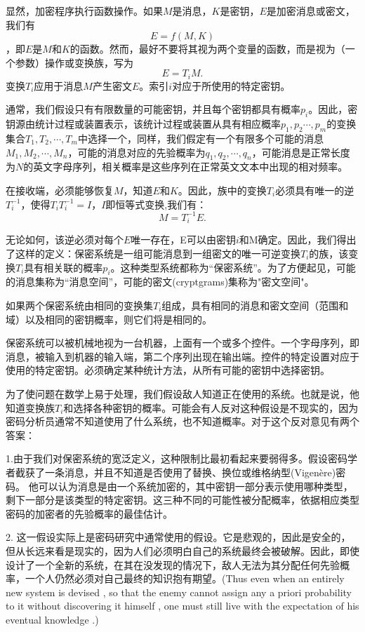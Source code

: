 \documentclass[]{article}
\begin{document}
显然，加密程序执行函数操作。如果$M$是消息，$K$是密钥，$E$是加密消息或密文，我们有\[E=f(M,K)\]，即$E$是$M$和$K$的函数。然而，最好不要将其视为两个变量的函数，而是视为（一个参数）操作或变换族，写为\[E=T_iM.\]
变换$T_i$应用于消息$M$产生密文$E$。索引$i$对应于所使用的特定密钥。

通常，我们假设只有有限数量的可能密钥，并且每个密钥都具有概率$p_i$。因此，密钥源由统计过程或装置表示，该统计过程或装置从具有相应概率$p_1,p_2\cdots,p_m$的变换集合$T_1,T_2,\cdots,T_m$中选择一个，同样，我们假定有一个有限多个可能的消息$M_1,M_2,\cdots,M_n$，可能的消息对应的先验概率为$q_1,q_2,\cdots,q_n$，可能消息是正常长度为$N$的英文字母序列，相关概率是这些序列在正常英文文本中出现的相对频率。

在接收端，必须能够恢复$M$，知道$E$和$K$。因此，族中的变换$T_i$必须具有唯一的逆$T^{-1}_i$，使得$T_iT^{-1}_i=I$，$I$即恒等式变换,我们有：\[M=T^{-1}_i E.\]

无论如何，该逆必须对每个$E$唯一存在，E可以由密钥$i$和M确定。因此，我们得出了这样的定义：保密系统是一组可能消息到一组密文的唯一可逆变换$T_i$的族，该变换$T_i$具有相关联的概率$p_i$。这种类型系统都称为“保密系统”。为了方便起见，可能的消息集称为“消息空间”，可能的密文(cryptgrams)集称为"密文空间"。

如果两个保密系统由相同的变换集$T_i$组成，具有相同的消息和密文空间（范围和域）以及相同的密钥概率，则它们将是相同的。

保密系统可以被机械地视为一台机器，上面有一个或多个控件。一个字母序列，即消息，被输入到机器的输入端，第二个序列出现在输出端。控件的特定设置对应于使用的特定密钥。必须确定某种统计方法，从所有可能的密钥中选择密钥。

为了使问题在数学上易于处理，我们假设敌人知道正在使用的系统。也就是说，他知道变换族$T_i$和选择各种密钥的概率。可能会有人反对这种假设是不现实的，因为密码分析员通常不知道使用了什么系统，也不知道概率。对于这个反对意见有两个答案：

1.由于我们对保密系统的宽泛定义，这种限制比最初看起来要弱得多。假设密码学者截获了一条消息，并且不知道是否使用了替换、换位或维格纳型(Vigen\`{e}re)密码。 他可以认为消息是由一个系统加密的，其中密钥一部分表示使用哪种类型，剩下一部分是该类型的特定密钥。这三种不同的可能性被分配概率，依据相应类型密码的加密者的先验概率的最佳估计。


2. 这一假设实际上是密码研究中通常使用的假设。它是悲观的，因此是安全的，但从长远来看是现实的，因为人们必须明白自己的系统最终会被破解。因此，即使设计了一个全新的系统，在其在没发现的情况下，敌人无法为其分配任何先验概率，一个人仍然必须对自己最终的知识抱有期望。(Thus even when an entirely new system is devised , so that the enemy cannot assign any a priori probability to it without discovering it himself , one must still live with the expectation of his eventual knowledge .)
\end{document}

